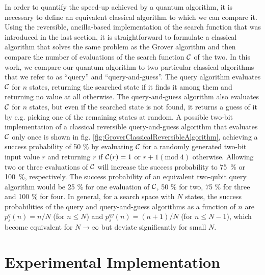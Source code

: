 In order to quantify the speed-up achieved by a quantum algorithm, it is necessary to define an equivalent classical algorithm to which we can compare it. Using the reversible, ancilla-based implementation of the search function that was introduced in the last section, it is straightforward to formulate a classical algorithm that solves the same problem as the Grover algorithm and then compare the number of evaluations of the search function $\Or$ of the two. In this work, we compare our quantum algorithm to two particular classical algorithms that we refer to as ``query'' and ``query-and-guess''. The query algorithm evaluates $\Or$ for $n$ states, returning the searched state if it finds it among them and returning no value at all otherwise. The query-and-guess algorithm also evaluates $\Or$ for $n$ states, but even if the searched state is not found, it returns a guess of it by e.g. picking one of the remaining states at random. A possible two-bit implementation of a classical reversible query-and-guess algorithm that evaluates $\Or$ only once is shown in fig. \ref{fig:GroverClassicalReversibleAlgorithm}, achieving a success probability of 50 \% by evaluating $\Or$ for a randomly generated two-bit input value $r$ and returning $r$ if $\Or(r)=1$ or $r+1(\mathrm{mod}\;4)$ otherwise. Allowing two or three evaluations of $\Or$ will increase the success probability to \mbox{75 \%} or \mbox{100 \%}, respectively. The success probability of an equivalent two-qubit query algorithm would be 25 \% for one evaluation of $\Or$, 50 \% for two, 75 \% for three and 100 \% for four. In general, for a search space with $N$ states, the success probabilities of the query and query-and-guess algorithms as a function of $n$ are $p_s^{q}(n)=n/N$ (for $n \le N$) and $p_s^{qg}(n)=(n+1)/N$ (for $n \le N-1$), which become equivalent for $N \to \infty$ but deviate significantly for small $N$.

\section{Experimental Implementation}


